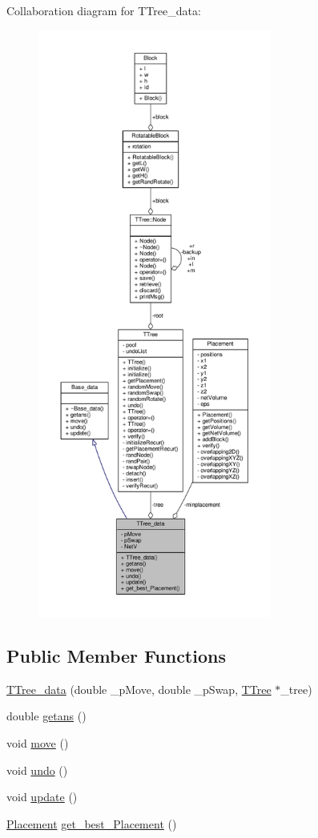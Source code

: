 Collaboration diagram for T\+Tree\+\_\+data\+:
\nopagebreak
\begin{figure}[H]
\begin{center}
\leavevmode
\includegraphics[height=550pt]{classTTree__data__coll__graph}
\end{center}
\end{figure}
\subsection*{Public Member Functions}
\begin{DoxyCompactItemize}
\item 
\hyperlink{classTTree__data_a5c15fc4f6ad8453e6de07e3defd1faeb}{T\+Tree\+\_\+data} (double \+\_\+p\+Move, double \+\_\+p\+Swap, \hyperlink{classTTree}{T\+Tree} $\ast$\+\_\+tree)
\item 
double \hyperlink{classTTree__data_a2524c0f18f01378fc80fd558e3b7cebb}{getans} ()
\item 
void \hyperlink{classTTree__data_a16a5d735999764d45d38d2327955696e}{move} ()
\item 
void \hyperlink{classTTree__data_ac2f447392cb0cf81db44d4f85d4bfd8a}{undo} ()
\item 
void \hyperlink{classTTree__data_a828b99a40bab8933fd3c648ee4f10d85}{update} ()
\item 
\hyperlink{classPlacement}{Placement} \hyperlink{classTTree__data_a4043bb9cd9f3d3b2509653d567c11fa8}{get\+\_\+best\+\_\+\+Placement} ()
\end{DoxyCompactItemize}
